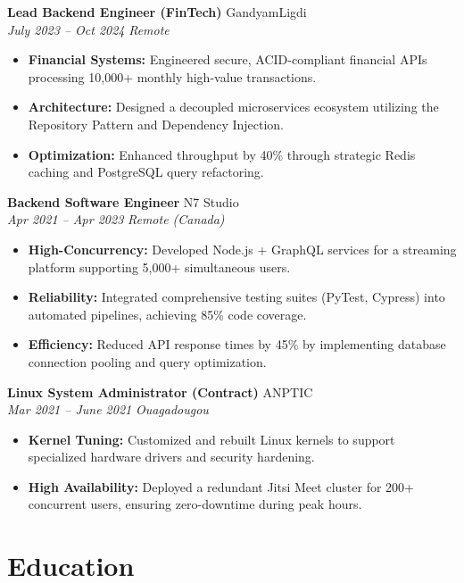 \documentclass[a4paper,10pt]{article}
\newcommand{\jobheader}[4]{%
    \textbf{#1} \hfill #2 \\
    \textit{#3} \hfill \textit{#4}
    \vspace{0.05cm}
}
\begin{document}
\vspace{0.15cm}

\jobheader{Lead Backend Engineer (FinTech)}{GandyamLigdi}{July 2023 -- Oct 2024}{Remote}
\begin{itemize}[leftmargin=*,nosep]
    \item \textbf{Financial Systems:} Engineered secure, ACID-compliant financial APIs processing 10,000+ monthly high-value transactions.
    \item \textbf{Architecture:} Designed a decoupled microservices ecosystem utilizing the Repository Pattern and Dependency Injection.
    \item \textbf{Optimization:} Enhanced throughput by 40\% through strategic Redis caching and PostgreSQL query refactoring.
\end{itemize}

\vspace{0.15cm}

\jobheader{Backend Software Engineer}{N7 Studio}{Apr 2021 -- Apr 2023}{Remote (Canada)}
\begin{itemize}[leftmargin=*,nosep]
    \item \textbf{High-Concurrency:} Developed Node.js + GraphQL services for a streaming platform supporting 5,000+ simultaneous users.
    \item \textbf{Reliability:} Integrated comprehensive testing suites (PyTest, Cypress) into automated pipelines, achieving 85\% code coverage.
    \item \textbf{Efficiency:} Reduced API response times by 45\% by implementing database connection pooling and query optimization.
\end{itemize}

\vspace{0.15cm}

\jobheader{Linux System Administrator (Contract)}{ANPTIC}{Mar 2021 -- June 2021}{Ouagadougou}
\begin{itemize}[leftmargin=*,nosep]
    \item \textbf{Kernel Tuning:} Customized and rebuilt Linux kernels to support specialized hardware drivers and security hardening.
    \item \textbf{High Availability:} Deployed a redundant Jitsi Meet cluster for 200+ concurrent users, ensuring zero-downtime during peak hours.
\end{itemize}

\section*{Education}
\end{document}
